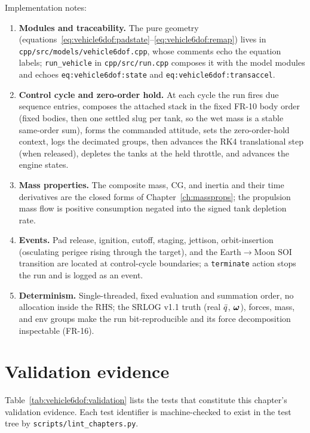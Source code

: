 Implementation notes:
\begin{enumerate}
  \item \textbf{Modules and traceability.} The pure geometry
    (equations~\eqref{eq:vehicle6dof:padstate}--\eqref{eq:vehicle6dof:remap})
    lives in \texttt{cpp/src/models/vehicle6dof.cpp}, whose comments echo the
    equation labels; \texttt{run\_vehicle} in \texttt{cpp/src/run.cpp}
    composes it with the model modules and echoes
    \texttt{eq:vehicle6dof:state} and \texttt{eq:vehicle6dof:transaccel}.
  \item \textbf{Control cycle and zero-order hold.} At each cycle the run
    fires due sequence entries, composes the attached stack in the fixed
    FR-10 body order (fixed bodies, then one settled slug per tank, so the
    wet mass is a stable same-order sum), forms the commanded attitude, sets
    the zero-order-hold context, logs the decimated groups, then advances the
    RK4 translational step (when released), depletes the tanks at the held
    throttle, and advances the engine states.
  \item \textbf{Mass properties.} The composite mass, CG, and inertia and
    their time derivatives are the closed forms of
    Chapter~\ref{ch:massprops}; the propulsion mass flow is positive
    consumption negated into the signed tank depletion rate.
  \item \textbf{Events.} Pad release, ignition, cutoff, staging, jettison,
    orbit-insertion (osculating perigee rising through the target), and the
    Earth$\to$Moon SOI transition are located at control-cycle boundaries;
    a \texttt{terminate} action stops the run and is logged as an event.
  \item \textbf{Determinism.} Single-threaded, fixed evaluation and
    summation order, no allocation inside the RHS; the SRLOG v1.1 truth
    (real $\bar{q}$, $\bm{\omega}$), forces, mass, and env groups make the
    run bit-reproducible and its force decomposition inspectable (FR-16).
\end{enumerate}

\section{Validation evidence}
\label{sec:vehicle6dof:validation}

Table~\ref{tab:vehicle6dof:validation} lists the tests that constitute this
chapter's validation evidence. Each test identifier is machine-checked to
exist in the test tree by \texttt{scripts/lint\_chapters.py}.

